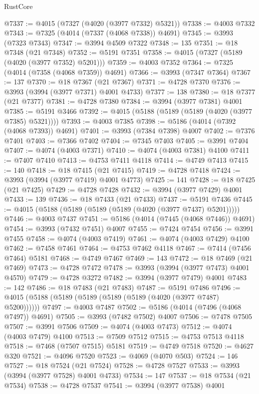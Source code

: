 \begin{lexlean}{RustCore}
\begin{coremodule}
@7337 := @4015 (@7327 (@4020 (@3977 @7332) @5321))
@7338 := @4003 @7332
@7343 := @7325 (@4014 (@7337 (@4068 @7338)) @4691)
@7345 := @3993 (@7323 @7343)
@7347 := @3994 @4509 @7322
@7348 := 135
@7351 := @18 @7348 (@21 @7348)
@7352 := @5191 @7351
@7358 := @4015 (@7327 (@5189 (@4020 (@3977 @7352) @5201)))
@7359 := @4003 @7352
@7364 := @7325 (@4014 (@7358 (@4068 @7359)) @4691)
@7366 := @3993 (@7347 @7364)
@7367 := 137
@7370 := @18 @7367 (@21 @7367)
@7371 := @4728 @7370
@7376 := @3993 (@3994 (@3977 @7371) @4001 @4733)
@7377 := 138
@7380 := @18 @7377 (@21 @7377)
@7381 := @4728 @7380
@7384 := @3994 (@3977 @7381) @4001
@7385 := @5191 @3466
@7392 := @4015 (@5188 (@5189 (@5189 (@4020 (@3977 @7385) @5321))))
@7393 := @4003 @7385
@7398 := @5186 (@4014 (@7392 (@4068 @7393)) @4691)
@7401 := @3993 (@7384 @7398) @4007
@7402 := @7376 @7401
@7403 := @7366 @7402
@7404 := @7345 @7403
@7405 := @3991 @7404
@7407 := @4074 (@4003 @7371)
@7410 := @4074 (@4003 @7381) @4100
@7411 := @7407 @7410
@7413 := @4753 @7411 @4118
@7414 := @4749 @7413
@7415 := 140
@7418 := @18 @7415 (@21 @7415)
@7419 := @4728 @7418
@7424 := @3993 (@3994 (@3977 @7419) @4001 @4773)
@7425 := 141
@7428 := @18 @7425 (@21 @7425)
@7429 := @4728 @7428
@7432 := @3994 (@3977 @7429) @4001
@7433 := 139
@7436 := @18 @7433 (@21 @7433)
@7437 := @5191 @7436
@7445 := @4015 (@5188 (@5189 (@5189 (@5189 (@4020 (@3977 @7437) @5201)))))
@7446 := @4003 @7437
@7451 := @5186 (@4014 (@7445 (@4068 @7446)) @4691)
@7454 := @3993 (@7432 @7451) @4007
@7455 := @7424 @7454
@7456 := @3991 @7455
@7458 := @4074 (@4003 @7419)
@7461 := @4074 (@4003 @7429) @4100
@7462 := @7458 @7461
@7464 := @4753 @7462 @4118
@7467 := @7414 (@7456 @7464) @5181
@7468 := @4749 @7467
@7469 := 143
@7472 := @18 @7469 (@21 @7469)
@7473 := @4728 @7472
@7478 := @3993 (@3994 (@3977 @7473) @4001 @4570)
@7479 := @4728 @3272
@7482 := @3994 (@3977 @7479) @4001
@7483 := 142
@7486 := @18 @7483 (@21 @7483)
@7487 := @5191 @7486
@7496 := @4015 (@5188 (@5189 (@5189 (@5189 (@5189 (@4020 (@3977 @7487) @5200))))))
@7497 := @4003 @7487
@7502 := @5186 (@4014 (@7496 (@4068 @7497)) @4691)
@7505 := @3993 (@7482 @7502) @4007
@7506 := @7478 @7505
@7507 := @3991 @7506
@7509 := @4074 (@4003 @7473)
@7512 := @4074 (@4003 @7479) @4100
@7513 := @7509 @7512
@7515 := @4753 @7513 @4118
@7518 := @7468 (@7507 @7515) @5181
@7519 := @4749 @7518
@7520 := @4627 @320
@7521 := @4096 @7520
@7523 := @4069 (@4070 @503)
@7524 := 146
@7527 := @18 @7524 (@21 @7524)
@7528 := @4728 @7527
@7533 := @3993 (@3994 (@3977 @7528) @4001 @4733)
@7534 := 147
@7537 := @18 @7534 (@21 @7534)
@7538 := @4728 @7537
@7541 := @3994 (@3977 @7538) @4001

\end{coremodule}
\end{lexlean}
